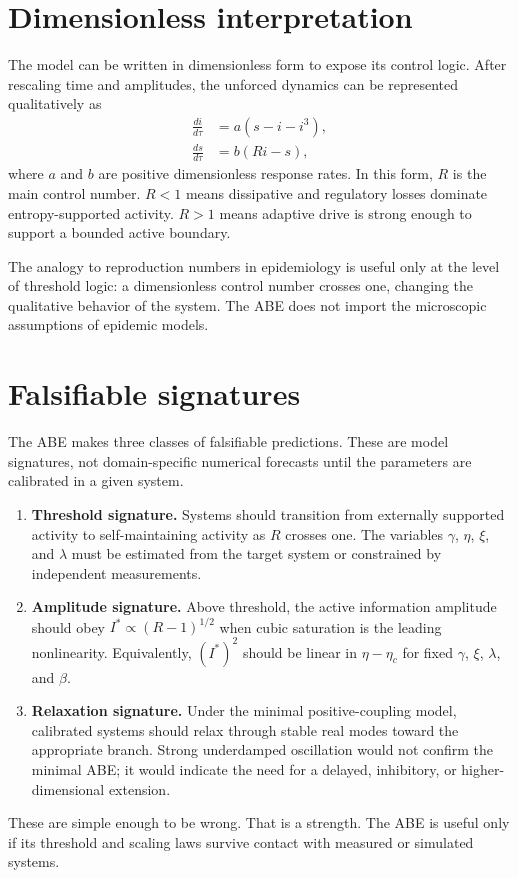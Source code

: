 \documentclass[11pt]{article}
\begin{document}
\section{Dimensionless interpretation}
The model can be written in dimensionless form to expose its control logic. After rescaling time and amplitudes, the unforced dynamics can be represented qualitatively as
\begin{align}
\frac{di}{d\tau}&=a(s-i-i^3),\\
\frac{ds}{d\tau}&=b(Ri-s),
\end{align}
where $a$ and $b$ are positive dimensionless response rates. In this form, $R$ is the main control number. $R<1$ means dissipative and regulatory losses dominate entropy-supported activity. $R>1$ means adaptive drive is strong enough to support a bounded active boundary.

The analogy to reproduction numbers in epidemiology is useful only at the level of threshold logic: a dimensionless control number crosses one, changing the qualitative behavior of the system. The ABE does not import the microscopic assumptions of epidemic models.

\section{Falsifiable signatures}
The ABE makes three classes of falsifiable predictions. These are model signatures, not domain-specific numerical forecasts until the parameters are calibrated in a given system.
\begin{enumerate}
  \item \textbf{Threshold signature.} Systems should transition from externally supported activity to self-maintaining activity as $R$ crosses one. The variables $\gamma$, $\eta$, $\xi$, and $\lambda$ must be estimated from the target system or constrained by independent measurements.
  \item \textbf{Amplitude signature.} Above threshold, the active information amplitude should obey $I^*\propto (R-1)^{1/2}$ when cubic saturation is the leading nonlinearity. Equivalently, $(I^*)^2$ should be linear in $\eta-\eta_c$ for fixed $\gamma$, $\xi$, $\lambda$, and $\beta$.
  \item \textbf{Relaxation signature.} Under the minimal positive-coupling model, calibrated systems should relax through stable real modes toward the appropriate branch. Strong underdamped oscillation would not confirm the minimal ABE; it would indicate the need for a delayed, inhibitory, or higher-dimensional extension.
\end{enumerate}
These are simple enough to be wrong. That is a strength. The ABE is useful only if its threshold and scaling laws survive contact with measured or simulated systems.
\end{document}
